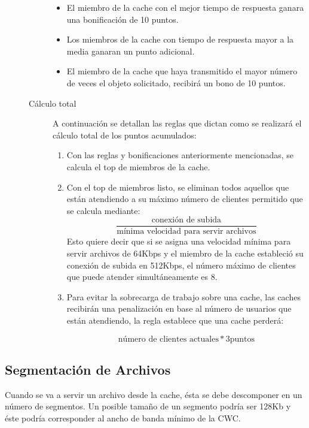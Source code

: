 \begin{description}
\begin{description}
		\begin{itemize}
		\item El miembro de la cache con el mejor tiempo de respuesta ganara una bonificación de 10 puntos.
		\item Los miembros de la cache con tiempo de respuesta mayor a la media ganaran un punto adicional.
		\item El miembro de la cache que haya transmitido el mayor número de veces el  objeto solicitado, recibirá un bono de 10 puntos.
		\end{itemize}

	\item[Cálculo total] A continuación se detallan las reglas que dictan como se realizará el cálculo total de los puntos acumulados: 
	
		\begin{enumerate}
		\item Con las reglas y bonificaciones anteriormente mencionadas, se calcula el top de miembros de la cache.
		\item Con el top de miembros listo, se eliminan todos aquellos que están atendiendo a su máximo número de clientes permitido que se calcula mediante: 
		$$ \frac {\text{conexión de subida}}{\text{mínima velocidad para servir archivos}} $$ 
		Esto quiere decir que si se asigna una velocidad mínima para servir archivos de 64Kbps y el miembro de la cache estableció su conexión de subida en 512Kbps, el número máximo de clientes que puede atender simultáneamente es 8.
		\item Para evitar la sobrecarga de trabajo sobre una cache, las caches recibirán una penalización en base al número de usuarios que están atendiendo, la regla establece que una cache perderá: 
		
		$$ \text{número de clientes actuales} * 3 \text{puntos} $$
		\end{enumerate}
	
	\end{description}

\end{description}


\subsection{Segmentación de Archivos}

Cuando se va a servir un archivo desde la cache, ésta se debe descomponer en un número de segmentos. Un posible tamaño de un segmento podría ser 128Kb y éste podría corresponder al ancho de banda mínimo de la CWC. 

